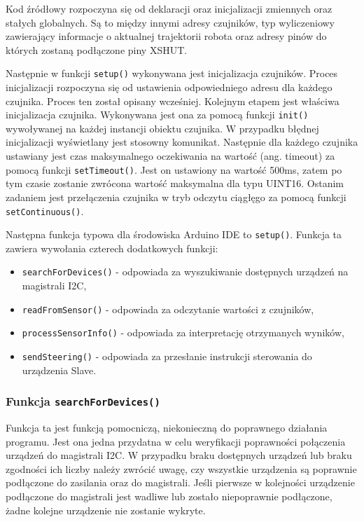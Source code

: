 \documentclass{report}
\begin{document}
Kod źródłowy rozpoczyna się od deklaracji oraz inicjalizacji zmiennych oraz stałych globalnych. Są to między innymi adresy czujników, typ wyliczeniowy zawierający informacje o aktualnej trajektorii robota oraz adresy pinów do których zostaną podłączone piny XSHUT. 

Następnie w funkcji \texttt{setup()} wykonywana jest inicjalizacja czujników. Proces inicjalizacji rozpoczyna się od ustawienia odpowiedniego adresu dla każdego czujnika. Proces ten został opisany wcześniej. Kolejnym etapem jest właściwa inicjalizacja czujnika. Wykonywana jest ona za pomocą funkcji \texttt{init()} wywoływanej na każdej instancji obiektu czujnika. W przypadku błędnej inicjalizacji wyświetlany jest stosowny komunikat. Następnie dla każdego czujnika ustawiany jest czas maksymalnego oczekiwania na wartość (ang. timeout) za pomocą funkcji \texttt{setTimeout()}. Jest on ustawiony na wartość 500ms, zatem po tym czasie zostanie zwrócona wartość maksymalna dla typu UINT16. Ostanim zadaniem jest przełączenia czujnika w tryb odczytu ciągłęgo za pomocą funkcji \texttt{setContinuous()}.


Następna funkcja typowa dla środowiska Arduino IDE to \texttt{setup()}. Funkcja ta zawiera wywołania czterech dodatkowych funkcji:
\begin{itemize}
    \item \texttt{searchForDevices()} - odpowiada za wyszukiwanie dostępnych urządzeń na magistrali I2C,
    \item \texttt{readFromSensor()} - odpowiada za odczytanie wartości z czujników,
    \item \texttt{processSensorInfo()} - odpowiada za interpretację otrzymanych wyników,
    \item \texttt{sendSteering()} - odpowiada za przesłanie instrukcji sterowania do urządzenia Slave.
\end{itemize}

\subsubsection*{Funkcja \texttt{searchForDevices()}}

Funkcja ta jest funkcją pomocniczą, niekonieczną do poprawnego działania programu. Jest ona jedna przydatna w celu weryfikacji poprawności połączenia urządzeń do magistrali I2C. W przypadku braku dostępnych urządzeń lub braku zgodności ich liczby należy zwrócić uwagę, czy wszystkie urządzenia są poprawnie podłączone do zasilania oraz do magistrali. Jeśli pierwsze w kolejności urządzenie podłączone do magistrali jest wadliwe lub zostało niepoprawnie podłączone, żadne kolejne urządzenie nie zostanie wykryte. 
\end{document}
